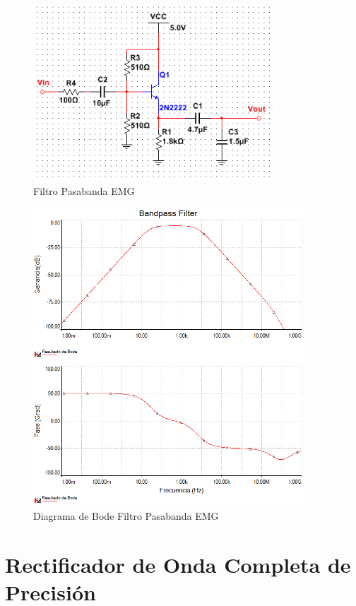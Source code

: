 \begin{figure}[H]
  \centering
  \includegraphics[width=0.8\textwidth]{Capitulo_2/bandpass_filt.png}
  \caption{Filtro Pasabanda EMG}
  \label{bandpass}
\end{figure}

\begin{figure}[H]
  \centering
  \includegraphics[width=0.9\textwidth]{Capitulo_2/bode_bandpass.png}
  \caption{Diagrama de Bode Filtro Pasabanda EMG}
  \label{bode_bandpass}
\end{figure}

\section{Rectificador de Onda Completa de Precisión}

